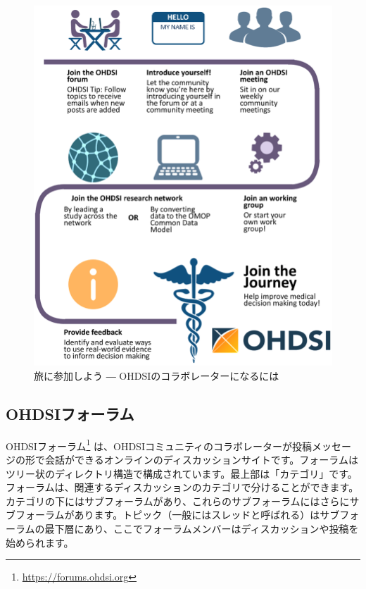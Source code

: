 \documentclass[
  11pt]{book}
\theoremstyle{definition}
\theoremstyle{definition}
\theoremstyle{definition}
\theoremstyle{definition}
\theoremstyle{remark}
\begin{document}
\begin{figure}

{\centering \includegraphics[width=0.9\linewidth]{images/WhereToBegin/joinTheJourney} 

}

\caption{旅に参加しよう ― OHDSIのコラボレーターになるには}\label{fig:jointhejourney}
\end{figure}

\subsection{OHDSIフォーラム}\label{ohdsiux30d5ux30a9ux30fcux30e9ux30e0}

OHDSIフォーラム\footnote{\url{https://forums.ohdsi.org}} は、OHDSIコミュニティのコラボレーターが投稿メッセージの形で会話ができるオンラインのディスカッションサイトです。フォーラムはツリー状のディレクトリ構造で構成されています。最上部は「カテゴリ」です。フォーラムは、関連するディスカッションのカテゴリで分けることができます。カテゴリの下にはサブフォーラムがあり、これらのサブフォーラムにはさらにサブフォーラムがあります。トピック（一般にはスレッドと呼ばれる）はサブフォーラムの最下層にあり、ここでフォーラムメンバーはディスカッションや投稿を始められます。
\end{document}
